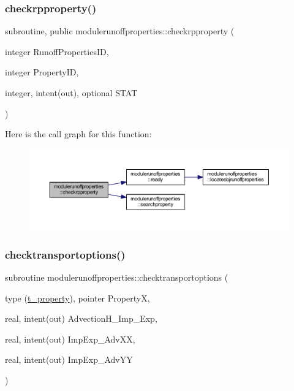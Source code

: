 \subsubsection{\texorpdfstring{checkrpproperty()}{checkrpproperty()}}
{\footnotesize\ttfamily subroutine, public modulerunoffproperties\+::checkrpproperty (\begin{DoxyParamCaption}\item[{integer}]{Runoff\+Properties\+ID,  }\item[{integer}]{Property\+ID,  }\item[{integer, intent(out), optional}]{S\+T\+AT }\end{DoxyParamCaption})}

Here is the call graph for this function\+:\nopagebreak
\begin{figure}[H]
\begin{center}
\leavevmode
\includegraphics[width=350pt]{namespacemodulerunoffproperties_a2c0e22dfe3b09a4715eaf763f273241b_cgraph}
\end{center}
\end{figure}
\mbox{\label{namespacemodulerunoffproperties_a5f610fc72802ac17615405bcd3f2f930}} 
\subsubsection{\texorpdfstring{checktransportoptions()}{checktransportoptions()}}
{\footnotesize\ttfamily subroutine modulerunoffproperties\+::checktransportoptions (\begin{DoxyParamCaption}\item[{type (\mbox{\hyperlink{structmodulerunoffproperties_1_1t__property}{t\+\_\+property}}), pointer}]{PropertyX,  }\item[{real, intent(out)}]{Advection\+H\+\_\+\+Imp\+\_\+\+Exp,  }\item[{real, intent(out)}]{Imp\+Exp\+\_\+\+Adv\+XX,  }\item[{real, intent(out)}]{Imp\+Exp\+\_\+\+Adv\+YY }\end{DoxyParamCaption})\hspace{0.3cm}{\ttfamily [private]}}

